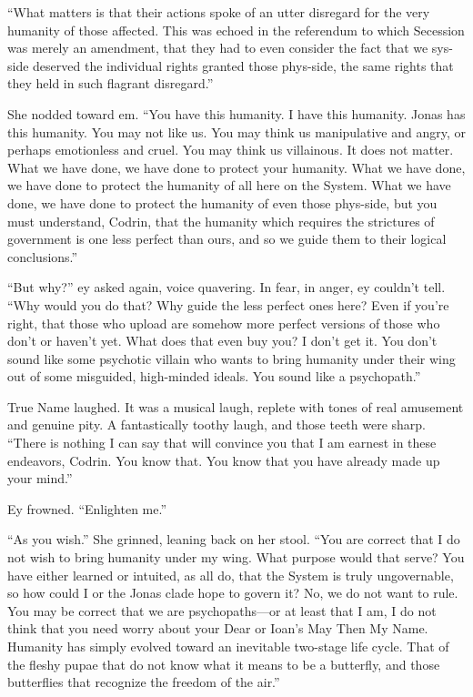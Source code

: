 ``What matters is that their actions spoke of an utter disregard for the very humanity of those affected. This was echoed in the referendum to which Secession was merely an amendment, that they had to even consider the fact that we sys-side deserved the individual rights granted those phys-side, the same rights that they held in such flagrant disregard.''

She nodded toward em. ``You have this humanity. I have this humanity. Jonas has this humanity. You may not like us. You may think us manipulative and angry, or perhaps emotionless and cruel. You may think us villainous. It does not matter. What we have done, we have done to protect your humanity. What we have done, we have done to protect the humanity of all here on the System. What we have done, we have done to protect the humanity of even those phys-side, but you must understand, Codrin, that the humanity which requires the strictures of government is one less perfect than ours, and so we guide them to their logical conclusions.''

``But why?'' ey asked again, voice quavering. In fear, in anger, ey couldn't tell. ``Why would you do that? Why guide the less perfect ones here? Even if you're right, that those who upload are somehow more perfect versions of those who don't or haven't yet. What does that even buy you? I don't get it. You don't sound like some psychotic villain who wants to bring humanity under their wing out of some misguided, high-minded ideals. You sound like a psychopath.''

True Name laughed. It was a musical laugh, replete with tones of real amusement and genuine pity. A fantastically toothy laugh, and those teeth were sharp. ``There is nothing I can say that will convince you that I am earnest in these endeavors, Codrin. You know that. You know that you have already made up your mind.''

Ey frowned. ``Enlighten me.''

``As you wish.'' She grinned, leaning back on her stool. ``You are correct that I do not wish to bring humanity under my wing. What purpose would that serve? You have either learned or intuited, as all do, that the System is truly ungovernable, so how could I or the Jonas clade hope to govern it? No, we do not want to rule. You may be correct that we are psychopaths---or at least that I am, I do not think that you need worry about your Dear or Ioan's May Then My Name. Humanity has simply evolved toward an inevitable two-stage life cycle. That of the fleshy pupae that do not know what it means to be a butterfly, and those butterflies that recognize the freedom of the air.''

